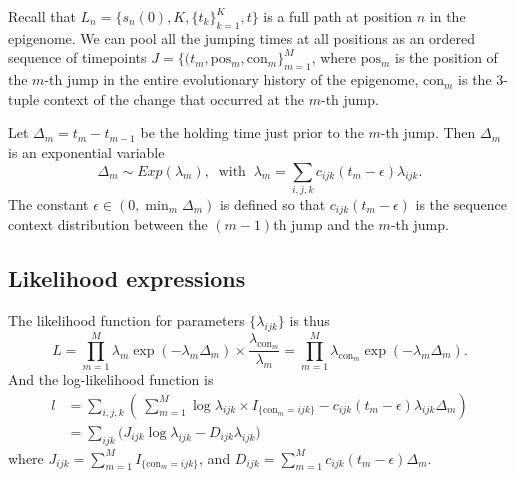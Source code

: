 \documentclass[11pt]{article}
\newcommand{\context}{\ensuremath{\mathrm{con}}}
\newcommand{\psn}{\ensuremath{\mathrm{pos}}}
\begin{document}
Recall that $L_n = \{s_n(0), K, \{t_k\}_{k=1}^K, t\}$ is a full path
at position $n$ in the epigenome. We can pool all the jumping times at
all positions as an ordered sequence of timepoints $J = \{(t_m, \psn{}_m,
\context{}_m\}_{m=1}^{M}$, where $\psn{}_m$ is the position of the
$m$-th jump in the entire evolutionary history of the epigenome,
$\context{}_m$ is the 3-tuple context of the change that
occurred at the $m$-th jump.

Let $\Delta_m = t_m - t_{m-1}$ be the holding time just prior to the
$m$-th jump. Then $\Delta_m$ is an exponential variable
\[
\Delta_m \sim \mathit{Exp}(\lambda_m), ~\text{ with }~
\lambda_m = \sum_{i,j,k}c_{ijk}(t_m - \epsilon)\lambda_{ijk}.
\]
The constant $\epsilon \in (0, \textstyle\min_m \Delta_{m})$ is
defined so that $c_{ijk}(t_m - \epsilon)$ is the sequence context
distribution between the $(m-1)$th jump and the $m$-th jump.

\subsection{Likelihood expressions}

The likelihood function for parameters $\{\lambda_{ijk}\}$ is thus
\begin{equation}\label{eqn:lik}
L = \prod\limits_{m=1}^{M} \lambda_m \exp(-\lambda_m\Delta_m) \times \frac{\lambda_{\context{}_m}}{\lambda_m}
=\prod\limits_{m=1}^{M}\lambda_{\context{}_m}\exp(-\lambda_m\Delta_m).
\end{equation}
And the log-likelihood function is
\begin{equation}\label{eqn:loglik1}
\begin{aligned}
l & = \sum_{i,j,k} \left(~
\sum_{m=1}^M\log\lambda_{ijk}\times I_{\{\context{}_m = ijk\}} - c_{ijk}(t_m-\epsilon)\lambda_{ijk}\Delta_m\right) \\
& = \sum\limits_{ijk} \big(J_{ijk}\log\lambda_{ijk} - D_{ijk}\lambda_{ijk} \big)
\end{aligned}
\end{equation}
where $J_{ijk} = \sum_{m=1}^M I_{\{\context{}_m = ijk\}}$, and $D_{ijk} = \sum_{m=1}^Mc_{ijk}(t_m-\epsilon)\Delta_m$.
\end{document}
